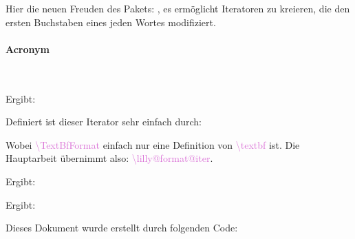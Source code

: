 \documentclass{article}
\newcommand*{\blankcmd}[1]{\textcolor{Orchid}{\LILLYxlstTypeWriter\textbackslash #1}}
\begin{document}
\begin{bemerkung}
    Hier die neuen Freuden des Pakets: , es ermöglicht
    Iteratoren zu kreieren, die den ersten Buchstaben eines jeden Wortes modifiziert.
\end{bemerkung}

\paragraph{Acronym}~\\[-\baselineskip]
\begin{latex}
\end{latex}
Ergibt:
\begin{center}
\end{center}
Definiert ist dieser Iterator sehr einfach durch:
Wobei \blankcmd{TextBfFormat} einfach nur eine Definition von \blankcmd{textbf} ist. Die Hauptarbeit übernimmt also:
\blankcmd{lilly@format@iter}.

\begin{latex}
\end{latex}
Ergibt:
\begin{center}
\end{center}

\begin{latex}
\end{latex}
Ergibt:
\begin{center}
\end{center}

\clearpage

Dieses Dokument wurde erstellt durch folgenden Code:
\end{document}
